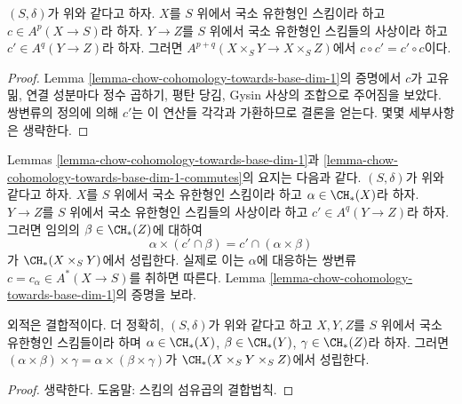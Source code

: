 \begin{lemma}
\label{lemma-chow-cohomology-towards-base-dim-1-commutes}
$(S, \delta)$가 위와 같다고 하자. $X$를 $S$ 위에서 국소 유한형인
스킴이라 하고 $c \in A^p(X \to S)$라 하자. $Y \to Z$를 $S$ 위에서
국소 유한형인 스킴들의 사상이라 하고 $c' \in A^q(Y \to Z)$라 하자.
그러면 $A^{p + q}(X \times_S Y \to X \times_S Z)$에서
$c \circ c' = c' \circ c$이다.
\end{lemma}

\begin{proof}
Lemma \ref{lemma-chow-cohomology-towards-base-dim-1}의 증명에서 $c$가
고유 밂, 연결 성분마다 정수 곱하기, 평탄 당김, Gysin 사상의 조합으로
주어짐을 보았다. 쌍변류의 정의에 의해 $c'$는 이 연산들 각각과
가환하므로 결론을 얻는다. 몇몇 세부사항은 생략한다.
\end{proof}

\begin{remark}
\label{remark-commuting-exterior-dim-1}
Lemmas \ref{lemma-chow-cohomology-towards-base-dim-1}과
\ref{lemma-chow-cohomology-towards-base-dim-1-commutes}의 요지는
다음과 같다. $(S, \delta)$가 위와 같다고 하자. $X$를 $S$ 위에서
국소 유한형인 스킴이라 하고 $\alpha \in \CH_*(X)$라 하자.
$Y \to Z$를 $S$ 위에서 국소 유한형인 스킴들의 사상이라 하고
$c' \in A^q(Y \to Z)$라 하자. 그러면 임의의
$\beta \in \CH_*(Z)$에 대하여
$$
\alpha \times (c' \cap \beta) = c' \cap (\alpha \times \beta)
$$
가 $\CH_*(X \times_S Y)$에서 성립한다. 실제로 이는 $\alpha$에
대응하는 쌍변류 $c = c_\alpha \in A^*(X \to S)$를 취하면 따른다.
Lemma \ref{lemma-chow-cohomology-towards-base-dim-1}의 증명을 보라.
\end{remark}

\begin{lemma}
\label{lemma-exterior-product-associative-dim-1}
외적은 결합적이다. 더 정확히, $(S, \delta)$가 위와 같다고 하고
$X, Y, Z$를 $S$ 위에서 국소 유한형인 스킴들이라 하며
$\alpha \in \CH_*(X)$, $\beta \in \CH_*(Y)$,
$\gamma \in \CH_*(Z)$라 하자. 그러면
$(\alpha \times \beta) \times \gamma =
\alpha \times (\beta \times \gamma)$가
$\CH_*(X \times_S Y \times_S Z)$에서 성립한다.
\end{lemma}

\begin{proof}
생략한다. 도움말: 스킴의 섬유곱의 결합법칙.
\end{proof}















